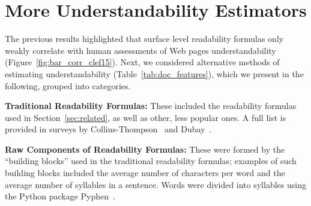 
\section{ More Understandability Estimators}
\label{sec:proxies}
The previous results highlighted that surface level readability formulas only weakly correlate with human assessments of Web pages understandability (Figure~\ref{fig:bar_corr_clef15}). Next, we considered alternative methods of estimating understandability (Table~\ref{tab:doc_features}), which we present in the following, grouped into categories. 




 


\textbf{Traditional Readability Formulas:}
These included the readability formulas used in Section~\ref{sec:related}, as well as other, less popular ones. A full list is provided in surveys by Collins-Thompson~\cite{collins2014computational} and Dubay~\cite{dubay04}.



\textbf{Raw Components of Readability Formulas:}
These were formed by the ``building blocks'' used in the traditional readability formulas; examples of such building blocks included the average number of characters per word and the average number of syllables in a sentence. Words were divided into syllables using the Python package Pyphen~\cite{pyphen}.



